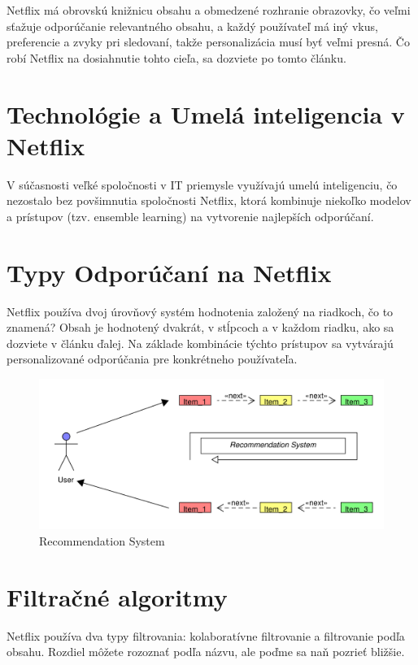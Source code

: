 \documentclass[10pt,slovak,a4paper]{article}
\begin{document}
Netflix má obrovskú knižnicu obsahu a obmedzené rozhranie obrazovky, čo veľmi sťažuje odporúčanie relevantného obsahu, a každý používateľ má iný vkus, preferencie a zvyky pri sledovaní, takže personalizácia musí byť veľmi presná.\cite{Bennett}
Čo robí Netflix na dosiahnutie tohto cieľa, sa dozviete po tomto článku.

\section{Technológie a Umelá inteligencia v Netflix}
V súčasnosti veľké spoločnosti v IT priemysle využívajú umelú inteligenciu, čo nezostalo bez povšimnutia spoločnosti Netflix, ktorá kombinuje niekoľko modelov a prístupov (tzv. ensemble learning) na vytvorenie najlepších odporúčaní.\cite{Bennett}

\section{Typy Odporúčaní na Netflix}
Netflix používa dvoj úrovňový systém hodnotenia založený na riadkoch, čo to znamená? Obsah je hodnotený dvakrát, v stĺpcoch a v každom riadku, ako sa dozviete v článku ďalej.
Na základe kombinácie týchto prístupov sa vytvárajú personalizované odporúčania pre konkrétneho používateľa.\cite{Habr}

\begin{figure}[h!]
  \centering
  \includegraphics[width=1\textwidth]{Images/RecommendationSystem_pdf.pdf} %
  \caption{Recommendation System}
\end{figure}

\section{Filtračné algoritmy}
Netflix používa dva typy filtrovania: kolaboratívne filtrovanie a filtrovanie podľa obsahu. Rozdiel môžete rozoznať podľa názvu, ale poďme sa naň pozrieť bližšie.  
\end{document}
